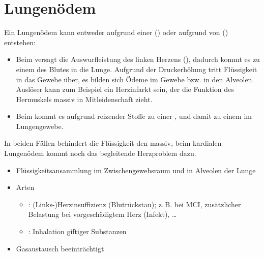 \section{Lungenödem}
\label{topic:lungenoedem}

\nopagebreak

{%
Ein Lungenödem kann entweder aufgrund einer
 () oder aufgrund
  von  ()
entstehen:
\begin{itemize}
  \item Beim  versagt die Auswurfleistung
  des linken Herzens (), dadurch
  kommt es zu einem  des Blutes in die Lunge.
  Aufgrund der Druckerhöhung tritt Flüssigkeit in das Gewebe
  über, es bilden sich Ödeme im Gewebe bzw.
   in den Alveolen. Auslöser kann
  zum Beispiel ein Herzinfarkt sein, der die Funktion des
  Hermuskels massiv in Mitleidenschaft zieht.
  \item Beim  kommt es aufgrund reizender
  Stoffe zu einer , und damit zu einem
   im Lungengewebe.
\end{itemize}

In beiden Fällen behindert die Flüssigkeit den
 massiv, beim kardialen Lungenödem kommt
noch das begleitende Herzproblem dazu.

}{
\begin{itemize}
  \item Flüssigkeitsansammlung im Zwischengewebsraum und in 
  Alveolen der Lunge
  \item Arten
  \begin{itemize}
    \item {}: (Links-)Herzinsuffizienz (Blutrückstau); 
    z.\,B. bei MCI, zusätzlicher Belastung bei vorgeschädigtem Herz
    (Infekt), \ldots
    \item {}: Inhalation giftiger Substanzen
  \end{itemize}
  \item Gasaustausch beeinträchtigt
\end{itemize}

}{}{}{}









